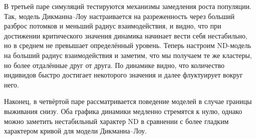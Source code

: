 \documentclass[12pt,a4paper]{article}
\begin{document}
В третьей паре симуляций тестируются механизмы замедления роста популяции. Так, модель Дикманна--Лоу настраивается на разреженность через больший разброс потомков и меньший радиус взаимодействия, и видно, что при достижении критического значения динамика начинает вести себя нестабильно, но в среднем не превышает определённый уровень. Теперь настроим ND-модель на больший радиус взаимодействия и заметим, что мы получаем те же кластеры, но более отдалённые друг от друга. По динамике видно, что количество индивидов быстро достигает некоторого значения и далее флуктуирует вокруг него.

Наконец, в четвёртой паре рассматривается поведение моделей в случае границы выживания снизу. Оба графика динамики медленно стремятся к нулю, однако можно заметить нестабильный характер ND в сравнении с более гладким характером кривой для модели Дикманна--Лоу.
\end{document}
